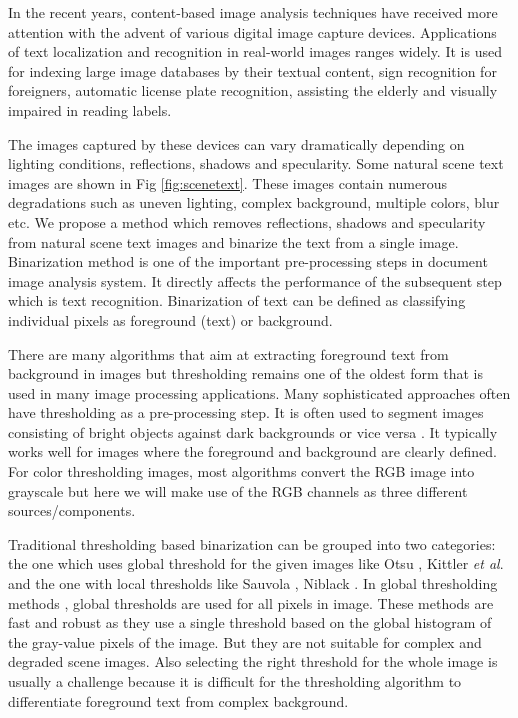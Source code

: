 In the recent years, content-based image analysis techniques have received more attention with the 
advent of various digital image capture devices.
Applications of text localization
and recognition in real-world images ranges widely. It is used for indexing large image
databases by their textual content, sign recognition
for foreigners, automatic license plate recognition, assisting the elderly and visually
impaired in reading labels.

The images captured by these devices can vary dramatically depending on lighting conditions, reflections, 
shadows and specularity. Some natural scene text images are shown in Fig \ref{fig:scenetext}.
These images contain numerous degradations such as uneven lighting, complex background, multiple colors, blur etc.
We propose a method which removes reflections, shadows and specularity from natural scene text images and 
binarize the text from a single image.
Binarization method is one of the important pre-processing steps in document image analysis system. 
It directly affects the performance of the subsequent step which is text recognition.
Binarization of text can be defined as classifying individual pixels as foreground (text) or background. 

There are many algorithms that aim at extracting foreground text from background in images but thresholding remains one of
the oldest form that is used in many image processing applications. Many sophisticated approaches often have thresholding as a pre-processing step. 
It is often used to segment images consisting of bright objects against dark backgrounds or vice versa \cite{A1,A3,A4}.
It typically works well for images where the foreground and background are clearly defined.
For color thresholding images, most algorithms convert the 
RGB image into grayscale but here we will make use of the RGB channels as three different sources/components. 

Traditional thresholding based binarization can be grouped into two categories: the one which uses global
threshold for the given images like Otsu \cite{A2}, Kittler {\em et al}. 
\cite{A5} and the one with local thresholds like Sauvola \cite{A6},
Niblack \cite{A9}. In global thresholding methods \cite{A2,A7}, global thresholds are
used for all pixels in image. These methods are fast and robust as
they use a single threshold based on the global histogram of the gray-value pixels of the image.
But they are not suitable for complex
and degraded scene images. 
Also selecting the right threshold for the whole image is usually a challenge 
because it is difficult for the thresholding
algorithm to differentiate foreground text from complex background.


